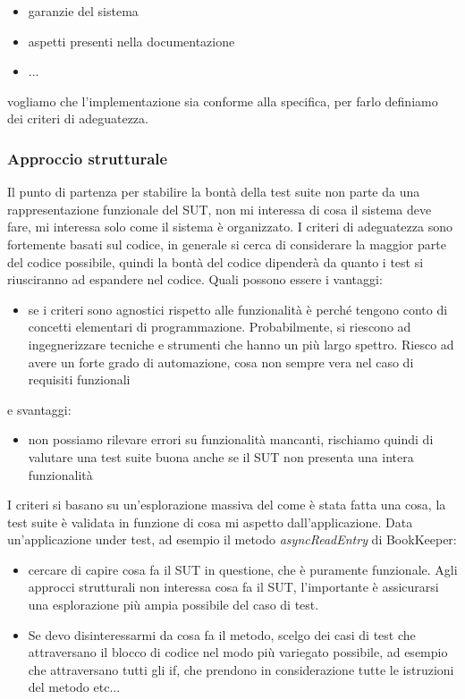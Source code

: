 \documentclass{article}
\begin{document}
\begin{itemize}
\item garanzie del sistema
\item aspetti presenti nella documentazione
\item ...
\end{itemize}
vogliamo che l'implementazione sia conforme alla specifica, per farlo definiamo dei criteri di adeguatezza.
\subsubsection{Approccio strutturale}
Il punto di partenza per stabilire la bontà della test suite non parte da una rappresentazione funzionale del SUT, non mi interessa di cosa il sistema deve fare, mi interessa solo come il sistema è organizzato. I criteri di adeguatezza sono fortemente basati sul codice, in generale si cerca di considerare la maggior parte del codice possibile, quindi la bontà del codice dipenderà da quanto i test si riusciranno ad espandere nel codice. Quali possono essere i vantaggi:
\begin{itemize}
\item se i criteri sono agnostici rispetto alle funzionalità è perché tengono conto di concetti elementari di programmazione. Probabilmente, si riescono ad ingegnerizzare tecniche e strumenti che hanno un più largo spettro. Riesco ad avere un forte grado di automazione, cosa non sempre vera nel caso di requisiti funzionali
\end{itemize}
e svantaggi: 
\begin{itemize}
\item non possiamo rilevare errori su funzionalità mancanti, rischiamo quindi di valutare una test suite buona anche se il SUT non presenta una intera funzionalità
\end{itemize}
I criteri si basano su un'esplorazione massiva del come è stata fatta una cosa, la test suite è validata in funzione di cosa mi aspetto dall'applicazione. Data un'applicazione under test, ad esempio il metodo \textit{asyncReadEntry} di BookKeeper:
\begin{itemize}
\item cercare di capire cosa fa il SUT in questione, che è puramente funzionale. Agli approcci strutturali non interessa cosa fa il SUT, l'importante è assicurarsi una esplorazione più ampia possibile del caso di test. 
\item Se devo disinteressarmi da cosa fa il metodo, scelgo dei casi di test che attraversano il blocco di codice nel modo più variegato possibile, ad esempio che attraversano tutti gli if, che prendono in considerazione tutte le istruzioni del  metodo etc...
\end{itemize}
\end{document}
